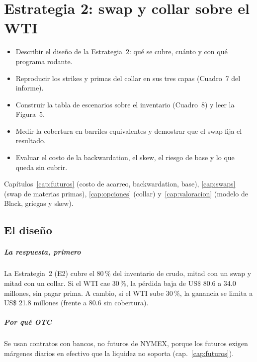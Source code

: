 \chapter{Estrategia 2: swap y collar sobre el WTI}\label{cap:e2}

\begin{objetivos}
\begin{itemize}
\item Describir el diseño de la Estrategia~2: qué se cubre, cuánto y con qué programa rodante.
\item Reproducir los strikes y primas del collar en sus tres capas (Cuadro~7 del informe).
\item Construir la tabla de escenarios sobre el inventario (Cuadro~8) y leer la Figura~5.
\item Medir la cobertura en barriles equivalentes y demostrar que el swap fija el resultado.
\item Evaluar el costo de la backwardation, el skew, el riesgo de base y lo que queda sin cubrir.
\end{itemize}
\end{objetivos}

\begin{prerreq}Capítulos~\ref{cap:futuros} (costo de acarreo, backwardation, base), \ref{cap:swaps} (swap de materias primas), \ref{cap:opciones} (collar) y~\ref{cap:valoracion} (modelo de Black, griegas y skew).\end{prerreq}

\section{El diseño}

\paragraph{La respuesta, primero} La Estrategia~2 (E2) cubre el 80\,\% del inventario de crudo, mitad con un swap y mitad con un collar. Si el WTI cae 30\,\%, la pérdida baja de US\$ 80.6 a 34.0 millones, sin pagar prima. A cambio, si el WTI sube 30\,\%, la ganancia se limita a US\$ 21.8 millones (frente a 80.6 sin cobertura).

\paragraph{Por qué OTC} Se usan contratos con bancos, no futuros de NYMEX, porque los futuros exigen márgenes diarios en efectivo que la liquidez no soporta (cap.~\ref{cap:futuros}).

